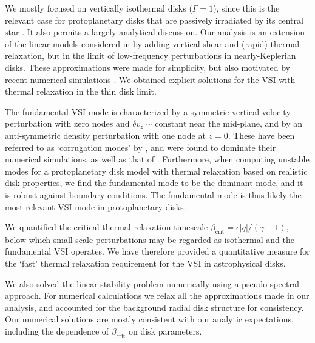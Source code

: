 
We mostly focused on vertically isothermal disks ($\Gamma=1$), since
this is the relevant case for protoplanetary disks that are passively irradiated by its central star 
\citep{chiang97}. It also permits a largely analytical discussion.
Our analysis is an extension of the linear models considered in
\cite{lubow93} by  adding vertical shear and (rapid) thermal
relaxation, but in the limit of low-frequency perturbations in
nearly-Keplerian disks. These approximations were made for simplicity,
but also motivated by recent numerical simulations
\citep{nelson13}. We obtained explicit solutions for the VSI with
thermal relaxation in the thin disk limit. 


The fundamental VSI mode is characterized by a symmetric vertical
velocity perturbation with zero nodes and $\delta
v_z\sim\mathrm{constant}$ near the mid-plane, and by an anti-symmetric
density perturbation with one node at $z=0$.  These have been referred
to as `corrugation modes' by \cite{nelson13}, and were found to
dominate their numerical simulations, as well as that of
\cite{stoll14}. Furthermore, when computing unstable modes for a
protoplanetary disk model with thermal relaxation based on realistic
disk properties, we find the fundamental mode to be the dominant mode,
 and it is robust against boundary conditions. The fundamental mode is
 thus likely the most relevant VSI mode in protoplanetary disks.  

We quantified the critical thermal relaxation timescale 
$\beta_\mathrm{crit}=\epsilon|q|/(\gamma-1)$, below which small-scale
perturbations may be regarded as isothermal and the fundamental VSI
operates. %
We have therefore provided a quantitative measure for the `fast'
thermal relaxation requirement for the VSI in astrophysical disks. 

We also solved the linear stability problem numerically using a
pseudo-spectral approach. For numerical calculations we relax all the
approximations made in our analysis, and accounted for
the background radial disk structure for consistency.  Our
numerical solutions are mostly consistent with our analytic 
expectations, including the dependence of $\beta_\mathrm{crit}$ on
disk parameters.  %


